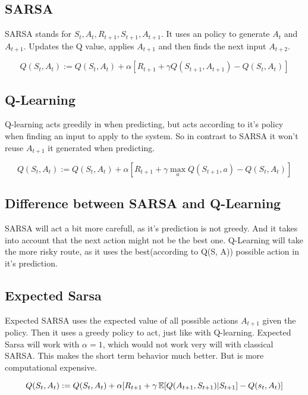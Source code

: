 \subsection{SARSA}
SARSA stands for $S_t,A_t,R_{t+1},S_{t+1}, A_{t+1}$. It uses an policy to generate $A_{t}$ and $A_{t+1}$. Updates the Q value, applies $A_{t+1}$ and then finds the next input $A_{t+2}$. 

\begin{equation}
Q(S_t, A_t) := Q(S_t, A_t) + \alpha [R_{t+1} + \gamma Q(S_{t+1}, A_{t+1})-Q(S_t, A_t)]
\end{equation}

\subsection{Q-Learning}
Q-learning acts greedily in when predicting, but acts according to it's policy when finding an input to apply to the system. So in contrast to SARSA it won't reuse $A_{t+1}$ it generated when predicting.

\begin{equation}
Q(S_t, A_t) := Q(S_t, A_t) + \alpha [R_{t+1} + \gamma \max_a Q(S_{t+1},a) - Q(S_t, A_t)]
\label{eq:Q learning update}
\end{equation}

\subsection{Difference between SARSA and Q-Learning}
SARSA will act a bit more carefull, as it's prediction is not greedy. And it takes into account that the next action might not be the best one. Q-Learning will take the more risky route, as it uses the best(according to Q(S, A)) possible action in it's prediction.

\subsection{Expected Sarsa}
Expected SARSA uses the expected value of all possible actions $A_{t+1}$ given the policy. Then it uses a greedy policy to act, just like with Q-learning. Expected Sarsa will work with $\alpha=1$, which would not work very will with classical SARSA. This makes the short term behavior much better. But is more computational expensive.

\begin{equation}
Q(S_t, A_t) := Q(S_t, A_t) + \alpha [R_{t+1} + \gamma \operatorname{\mathbb{E}}[Q(A_{t+1}, S_{t+1})|S_{t+1}] - Q(s_t, A_t)]
\label{eq:expected sarsa update rule}
\end{equation}

